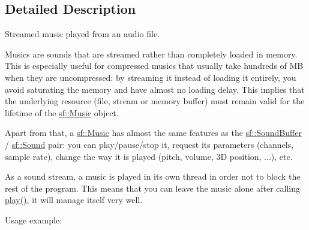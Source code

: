 \subsection{Detailed Description}
Streamed music played from an audio file. 

\begin{DoxyVerb}\end{DoxyVerb}


Musics are sounds that are streamed rather than completely loaded in memory. This is especially useful for compressed musics that usually take hundreds of MB when they are uncompressed\+: by streaming it instead of loading it entirely, you avoid saturating the memory and have almost no loading delay. This implies that the underlying resource (file, stream or memory buffer) must remain valid for the lifetime of the \mbox{\hyperlink{classsf_1_1_music}{sf\+::\+Music}} object.

Apart from that, a \mbox{\hyperlink{classsf_1_1_music}{sf\+::\+Music}} has almost the same features as the \mbox{\hyperlink{classsf_1_1_sound_buffer}{sf\+::\+Sound\+Buffer}} / \mbox{\hyperlink{classsf_1_1_sound}{sf\+::\+Sound}} pair\+: you can play/pause/stop it, request its parameters (channels, sample rate), change the way it is played (pitch, volume, 3D position, ...), etc.

As a sound stream, a music is played in its own thread in order not to block the rest of the program. This means that you can leave the music alone after calling \mbox{\hyperlink{classsf_1_1_sound_stream_afdc08b69cab5f243d9324940a85a1144}{play()}}, it will manage itself very well.

Usage example\+: 
\begin{DoxyCode}{0}
\DoxyCodeLine{\textcolor{comment}{// Declare a new music}}
\DoxyCodeLine{}
\DoxyCodeLine{\textcolor{comment}{// Open it from an audio file}}
\DoxyCodeLine{\{}
\DoxyCodeLine{    \textcolor{comment}{// error...}}
\DoxyCodeLine{\}}
\DoxyCodeLine{}
\DoxyCodeLine{\textcolor{comment}{// Change some parameters}}
\DoxyCodeLine{}
\DoxyCodeLine{\textcolor{comment}{// Play it}}
\end{DoxyCode}



